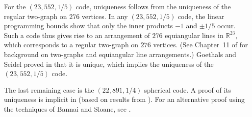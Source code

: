\documentclass{jams-l}
\theoremstyle{plain}
\numberwithin{theorem}{section}
\theoremstyle{definition}
\numberwithin{equation}{section}
\newcommand{\R}{{\mathbb R}}
\begin{document}
For the $(23,552,1/5)$ code, uniqueness follows from the
uniqueness of the regular two-graph on $276$ vertices.  In any
$(23,552,1/5)$ code, the linear programming bounds show that only
the inner products $-1$ and $\pm 1/5$ occur. Such a code thus
gives rise to an arrangement of $276$ equiangular lines in
$\R^{23}$, which corresponds to a regular two-graph on $276$
vertices. (See Chapter~11 of \cite{GR} for background on
two-graphs and equiangular line arrangements.)  Goethals and
Seidel proved in \cite{GS} that it is unique, which implies the
uniqueness of the $(23,552,1/5)$ code.

The last remaining case is the $(22,891,1/4)$ spherical code.  A
proof of its uniqueness is implicit in \cite{Cu} (based on results
from \cite{SY}).  For an alternative proof using the techniques of
Bannai and Sloane, see \cite{CK3}.
\end{document}
